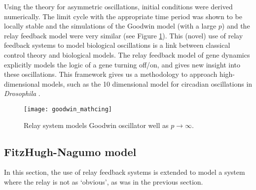 \documentclass[a4paper, 12pt]{article}
\begin{document}
Using the theory for asymmetric oscillations, initial conditions were derived numerically. The limit cycle with the appropriate time period was shown to be locally stable and the simulations of the Goodwin model (with a large $p$) and the relay feedback model were very similar (see Figure \ref{goodwin_matching}). This (novel) use of relay feedback systems to model biological oscillations is a link between classical control theory and biological models. The relay feedback model of gene dynamics explicitly models the logic of a gene turning off/on, and gives new insight into these oscillations. This framework  gives us a methodology to approach high-dimensional models, such as the 10 dimensional model for circadian  oscillations in \textit{Drosophila} \cite{leloup}. 

\begin{figure}[h!]
\texttt{[image: goodwin\_mathcing]}
\caption{Relay system models Goodwin oscillator well as $p\rightarrow\infty$.}
\label{goodwin_matching}
\end{figure}

\FloatBarrier
\subsection{FitzHugh-Nagumo model}
In this section, the use of relay feedback systems is extended to model a system where the relay is not as `obvious', as was in the previous section.
\end{document}
